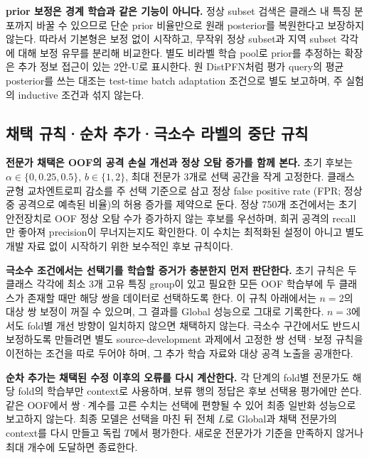 \textbf{prior 보정은 경계 학습과 같은 기능이 아니다.} 정상 subset 검색은 클래스 내 특징 분포까지 바꿀 수 있으므로 단순 prior 비율만으로 원래 posterior를 복원한다고 보장하지 않는다. 따라서 기본형은 보정 없이 시작하고, 무작위 정상 subset과 지역 subset 각각에 대해 보정 유무를 분리해 비교한다. 별도 비라벨 학습 pool로 prior를 추정하는 확장은 추가 정보 접근이 있는 2안-U로 표시한다. 원 DistPFN처럼 평가 query의 평균 posterior를 쓰는 대조는 test-time batch adaptation 조건으로 별도 보고하며, 주 실험의 inductive 조건과 섞지 않는다.

\subsection{채택 규칙·순차 추가·극소수 라벨의 중단 규칙}
\textbf{전문가 채택은 OOF의 공격 손실 개선과 정상 오탐 증가를 함께 본다.} 초기 후보는 $\alpha\in\{0,0.25,0.5\}$, $b\in\{1,2\}$, 최대 전문가 3개로 선택 공간을 작게 고정한다. 클래스 균형 교차엔트로피 감소를 주 선택 기준으로 삼고 정상 false positive rate (FPR; 정상 중 공격으로 예측된 비율)의 허용 증가를 제약으로 둔다. 정상 750개 조건에서는 초기 안전장치로 OOF 정상 오탐 수가 증가하지 않는 후보를 우선하며, 희귀 공격의 recall만 좋아져 precision이 무너지는지도 확인한다. 이 수치는 최적화된 설정이 아니고 별도 개발 자료 없이 시작하기 위한 보수적인 후보 규칙이다.

\textbf{극소수 조건에서는 선택기를 학습할 증거가 충분한지 먼저 판단한다.} 초기 규칙은 두 클래스 각각에 최소 3개 고유 특징 group이 있고 필요한 모든 OOF 학습부에 두 클래스가 존재할 때만 해당 쌍을 데이터로 선택하도록 한다. 이 규칙 아래에서는 $n=2$의 대상 쌍 보정이 꺼질 수 있으며, 그 결과를 Global 성능으로 그대로 기록한다. $n=3$에서도 fold별 개선 방향이 일치하지 않으면 채택하지 않는다. 극소수 구간에서도 반드시 보정하도록 만들려면 별도 source-development 과제에서 고정한 쌍 선택·보정 규칙을 이전하는 조건을 따로 두어야 하며, 그 추가 학습 자료와 대상 공격 노출을 공개한다.

\textbf{순차 추가는 채택된 수정 이후의 오류를 다시 계산한다.} 각 단계의 fold별 전문가도 해당 fold의 학습부만 context로 사용하며, 보류 행의 정답은 후보 선택용 평가에만 쓴다. 같은 OOF에서 쌍·계수를 고른 수치는 선택에 편향될 수 있어 최종 일반화 성능으로 보고하지 않는다. 최종 모델은 선택을 마친 뒤 전체 $L$로 Global과 채택 전문가의 context를 다시 만들고 독립 $T$에서 평가한다. 새로운 전문가가 기준을 만족하지 않거나 최대 개수에 도달하면 종료한다.


